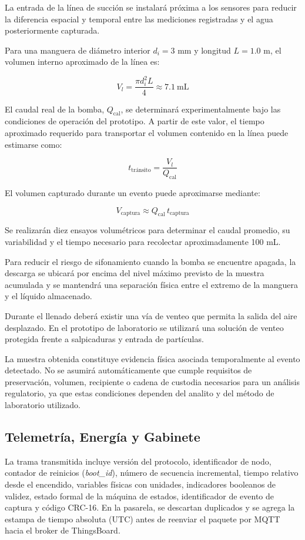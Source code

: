 \documentclass[11pt,a4paper]{article}
\begin{document}
La entrada de la línea de succión se instalará próxima a los sensores para reducir la diferencia espacial y temporal entre las mediciones registradas y el agua posteriormente capturada.

Para una manguera de diámetro interior $d_i = 3$ mm y longitud $L = 1.0$ m, el volumen interno aproximado de la línea es:

\begin{equation}
    V_l =
    \frac{\pi d_i^2 L}{4}
    \approx 7.1~\text{mL}
\end{equation}

El caudal real de la bomba, $Q_{\text{cal}}$, se determinará experimentalmente bajo las condiciones de operación del prototipo. A partir de este valor, el tiempo aproximado requerido para transportar el volumen contenido en la línea puede estimarse como:

\begin{equation}
    t_{\text{tránsito}}
    =
    \frac{V_l}{Q_{\text{cal}}}
\end{equation}

El volumen capturado durante un evento puede aproximarse mediante:

\begin{equation}
    V_{\text{captura}}
    \approx
    Q_{\text{cal}}\,t_{\text{captura}}
\end{equation}

Se realizarán diez ensayos volumétricos para determinar el caudal promedio, su variabilidad y el tiempo necesario para recolectar aproximadamente 100 mL.

Para reducir el riesgo de sifonamiento cuando la bomba se encuentre apagada, la descarga se ubicará por encima del nivel máximo previsto de la muestra acumulada y se mantendrá una separación física entre el extremo de la manguera y el líquido almacenado.

Durante el llenado deberá existir una vía de venteo que permita la salida del aire desplazado. En el prototipo de laboratorio se utilizará una solución de venteo protegida frente a salpicaduras y entrada de partículas.

La muestra obtenida constituye evidencia física asociada temporalmente al evento detectado. No se asumirá automáticamente que cumple requisitos de preservación, volumen, recipiente o cadena de custodia necesarios para un análisis regulatorio, ya que estas condiciones dependen del analito y del método de laboratorio utilizado.

\subsection{Telemetría, Energía y Gabinete}
La trama transmitida incluye versión del protocolo, identificador de nodo, contador de reinicios (\textit{boot\_id}), número de secuencia incremental, tiempo relativo desde el encendido, variables físicas con unidades, indicadores booleanos de validez, estado formal de la máquina de estados, identificador de evento de captura y código CRC-16. En la pasarela, se descartan duplicados y se agrega la estampa de tiempo absoluta (UTC) antes de reenviar el paquete por MQTT hacia el broker de ThingsBoard.
\end{document}
